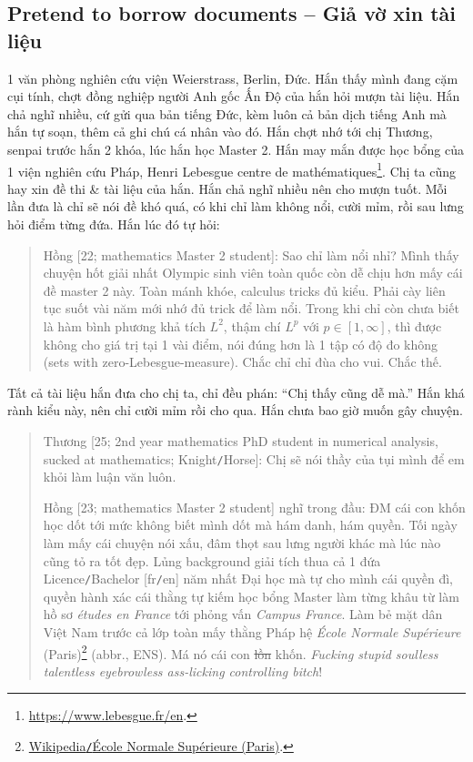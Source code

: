 \documentclass[12pt,twoside]{book}
\begin{document}
\subsection{Pretend to borrow documents -- Giả vờ xin tài liệu}
1 văn phòng nghiên cứu viện {\sc Weierstrass}, Berlin, Đức. Hắn thấy mình đang cặm cụi tính, chợt đồng nghiệp người Anh gốc Ấn Độ của hắn hỏi mượn tài liệu. Hắn chả nghĩ nhiều, cứ gửi qua bản tiếng Đức, kèm luôn cả bản dịch tiếng Anh mà hắn tự soạn, thêm cả ghi chú cá nhân vào đó. Hắn chợt nhớ tới chị Thương, senpai trước hắn 2 khóa, lúc hắn học Master 2. Hắn may mắn được học bổng của 1 viện nghiên cứu Pháp, {\sc Henri Lebesgue centre de math\'ematiques}\footnote{\url{https://www.lebesgue.fr/en}.}. Chị ta cũng hay xin đề thi \& tài liệu của hắn. Hắn chả nghĩ nhiều nên cho mượn tuốt. Mỗi lần đưa là chỉ sẽ nói đề khó quá, có khi chỉ làm không nổi, cười mỉm, rồi sau lưng hỏi điểm từng đứa. Hắn lúc đó tự hỏi:
\begin{quote}
	{\sf Hồng [22; mathematics Master 2 student]}: Sao chỉ làm nổi nhỉ? Mình thấy chuyện hốt giải nhất Olympic sinh viên toàn quốc còn dễ chịu hơn mấy cái đề master 2 này. Toàn mánh khóe, calculus tricks đủ kiểu. Phải cày liên tục suốt vài năm mới nhớ đủ trick để làm nổi. Trong khi chỉ còn chưa biết là hàm bình phương khả tích $L^2$, thậm chí $L^p$ với $p\in[1,\infty]$, thì được không cho giá trị tại 1 vài điểm, nói đúng hơn là 1 tập có độ đo không (sets with zero-Lebesgue-measure). Chắc chỉ chỉ đùa cho vui. Chắc thế.
\end{quote}
Tất cả tài liệu hắn đưa cho chị ta, chỉ đều phán: ``Chị thấy cũng dễ mà.'' Hắn khá rành kiểu này, nên chỉ cười mỉm rồi cho qua. Hắn chưa bao giờ muốn gây chuyện.
\begin{quote}
	{\sf Thương [25; 2nd year mathematics PhD student in numerical analysis, sucked at mathematics; Knight{\tt/}Horse]}: Chị sẽ nói thầy của tụi mình để em khỏi làm luận văn luôn.
	
	{\sf Hồng [23; mathematics Master 2 student]} nghĩ trong đầu: ĐM cái con khốn học dốt tới mức không biết mình dốt mà hám danh, hám quyền. Tối ngày làm mấy cái chuyện nói xấu, đâm thọt sau lưng người khác mà lúc nào cũng tỏ ra tốt đẹp. Lủng background giải tích thua cả 1 đứa Licence{\tt/}Bachelor [fr{\tt/}en] năm nhất Đại học mà tự cho mình cái quyền đì, quyền hành xác cái thằng tự kiếm học bổng Master làm từng khâu từ làm hồ sơ {\it \'etudes en France} tới phỏng vấn {\it Campus France}. Làm bẻ mặt dân Việt Nam trước cả lớp toàn mấy thằng Pháp hệ {\it École Normale Supérieure} (Paris)\footnote{\href{https://en.wikipedia.org/wiki/Ecole_normale_superieure_(Paris)}{Wikipedia{\tt/}École Normale Supérieure (Paris)}.} (abbr., ENS). Má nó cái con \st{lồn} khốn. {\it Fucking stupid soulless talentless eyebrowless ass-licking controlling bitch}!
\end{quote}
\end{document}
